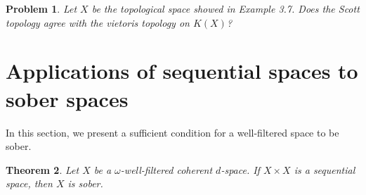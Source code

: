 \documentclass[preprint,12pt]{elsarticle}
\numberwithin{equation}{section}
\newtheorem{theorem}{Theorem}[section]
\newtheorem{problem}[theorem]{Problem}
\begin{document}
\begin{problem} {\rm Let $X$ be the topological space showed in Example 3.7. Does the Scott topology agree with the vietoris topology on $K(X)$?}

\end{problem}








\section{Applications of sequential spaces to sober spaces}\label{sec:fm}

In this section, we present a sufficient condition for a well-filtered space to be sober.

\begin{theorem} {\rm Let $X$ be a $\omega$-well-filtered coherent $d$-space. If $X\times X$ is a sequential space, then $X$ is sober.}
\end{theorem}
\end{document}
